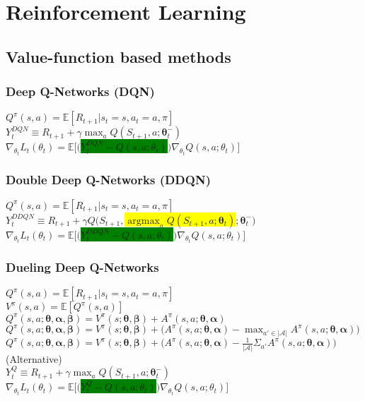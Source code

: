 \documentclass{article}
\DeclareMathOperator*{\argmax}{argmax}
\newcommand{\mathcolorbox}[2]{\colorbox{#1}{$\displaystyle #2$}}
\newcommand{\balpha}{\bm{\alpha}}
\newcommand{\bbeta}{\bm{\beta}}
\newcommand{\btheta}{\bm{\theta}}
\begin{document}
\section{Reinforcement Learning}

\subsection{Value-function based methods}

\subsubsection{Deep Q-Networks (DQN)}

$Q^{\pi}(s,a) = \mathbb{E}[ R_{t+1} | s_t = s, a_t = a, \pi ]$\\[10px]
$Y_t^{DQN} \equiv R_{t+1} + \gamma \max_a Q(S_{t+1},a; \btheta_t^-)$\\[10px]
$\nabla_{\theta_t}L_t(\theta_t) = \mathbb{E}\biggl[ \biggl($\mathcolorbox{green}{Y_t^{DQN} - Q(s,a;\theta_t)}$\biggr) \nabla_{\theta_t} Q(s,a; \theta_t) \biggr]$

\subsubsection{Double Deep Q-Networks (DDQN)}

$Q^{\pi}(s,a) = \mathbb{E}[ R_{t+1} | s_t = s, a_t = a, \pi ]$\\[10px]
$Y_t^{DDQN} \equiv R_{t+1} + \gamma Q\biggl(S_{t+1}, $\mathcolorbox{yellow}{\argmax_a Q(S_{t+1},a; \btheta_t)}$; \btheta_t^-\biggr)$\\[10px]
$\nabla_{\theta_t}L_t(\theta_t) = \mathbb{E}\biggl[ \biggl($\mathcolorbox{green}{Y_t^{DDQN} - Q(s,a;\theta_t)}$\biggr) \nabla_{\theta_t} Q(s,a; \theta_t) \biggr]$

\subsubsection{Dueling Deep Q-Networks}

$Q^{\pi}(s,a) = \mathbb{E}[ R_{t+1} | s_t = s, a_t = a, \pi ]$\\[10px]
$V^{\pi}(s,a) = \mathbb{E}[Q^{\pi}(s,a)]$\\[10px]
$Q^{\pi}(s,a; \btheta, \balpha, \bbeta) = V^{\pi}(s; \btheta, \bbeta) + A^{\pi}(s,a; \btheta, \balpha)$\\[10px]
$Q^{\pi}(s,a; \btheta, \balpha, \bbeta) = V^{\pi}(s; \btheta, \bbeta) + \biggl(A^{\pi}(s,a; \btheta, \balpha) - \max_{a' \in |\mathcal{A}|} A^{\pi}(s,a; \btheta, \balpha)\biggr)$\\[10px]
$Q^{\pi}(s,a; \btheta, \balpha, \bbeta) = V^{\pi}(s; \btheta, \bbeta) + \biggl(A^{\pi}(s,a; \btheta, \balpha) - \frac{1}{|\mathcal{A}|} \Sigma_{a'} A^{\pi}(s,a; \btheta, \balpha)\biggr)$ (Alternative)\\[10px]
$Y_t^Q \equiv R_{t+1} + \gamma \max_a Q(S_{t+1},a; \btheta_t^-)$\\[10px]
$\nabla_{\theta_t}L_t(\theta_t) = \mathbb{E}\biggl[ \biggl($\mathcolorbox{green}{Y_t^Q - Q(s,a;\theta_t)}$\biggr) \nabla_{\theta_t} Q(s,a; \theta_t) \biggr]$
\end{document}
